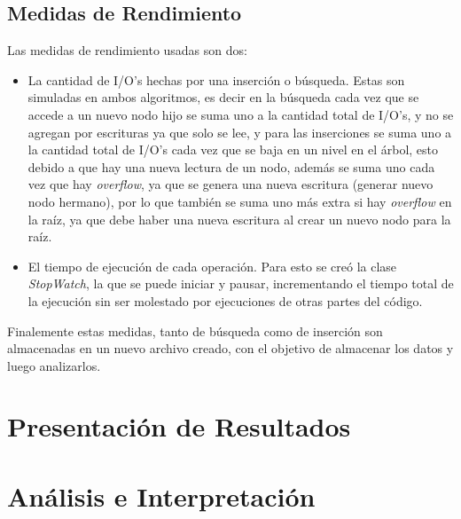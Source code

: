 \documentclass[letterpaper,12pt]{article}
\begin{document}
\subsection{Medidas de Rendimiento}
Las medidas de rendimiento usadas son dos:
\begin{itemize}
\item La cantidad de I/O's hechas por una inserci\'on o b\'usqueda. Estas son simuladas en ambos algoritmos, es decir en la b\'usqueda cada vez que se accede a un nuevo nodo hijo se suma uno a la cantidad total de I/O's, y no se agregan por escrituras ya que solo se lee, y para las inserciones se suma uno a la cantidad total de I/O's cada vez que se baja en un nivel en el \'arbol, esto debido a que hay una nueva lectura de un nodo, adem\'as se suma uno cada vez que hay \textit{overflow}, ya que se genera una nueva escritura (generar nuevo nodo hermano), por lo que tambi\'en se suma uno m\'as extra si hay \textit{overflow} en la ra\'iz, ya que debe haber una nueva escritura al crear un nuevo nodo para la ra\'iz.

\item El tiempo de ejecuci\'on de cada operaci\'on. Para esto se cre\'o la clase \textit{StopWatch}, la que se puede iniciar y pausar, incrementando el tiempo total de la ejecución sin ser molestado por ejecuciones de otras partes del c\'odigo.
\end{itemize}
Finalemente estas medidas, tanto de b\'usqueda como de inserci\'on son almacenadas en un nuevo archivo creado, con el objetivo de almacenar los datos y luego analizarlos.
\newpage
\section{Presentaci\'on de Resultados}


\newpage
\section{An\'alisis e Interpretaci\'on}
 
 
 
 
 
 
\end{document}
